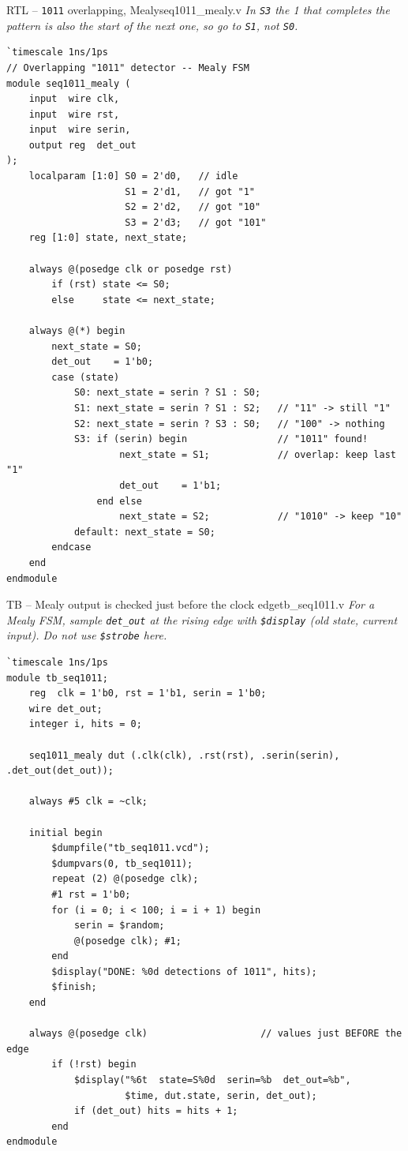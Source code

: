\documentclass[10pt,a4paper]{article}
\newcommand{\slicenote}[1]{{\small\color{black!70}\itshape #1}\par\smallskip}
\begin{document}
\begin{codeslice}{RTL -- \texttt{1011} overlapping, Mealy}{seq1011\_mealy.v}
\slicenote{In \texttt{S3} the 1 that completes the pattern is also the start of the next one, so go to \texttt{S1}, not \texttt{S0}.}
\begin{lstlisting}
`timescale 1ns/1ps
// Overlapping "1011" detector -- Mealy FSM
module seq1011_mealy (
    input  wire clk,
    input  wire rst,
    input  wire serin,
    output reg  det_out
);
    localparam [1:0] S0 = 2'd0,   // idle
                     S1 = 2'd1,   // got "1"
                     S2 = 2'd2,   // got "10"
                     S3 = 2'd3;   // got "101"
    reg [1:0] state, next_state;

    always @(posedge clk or posedge rst)
        if (rst) state <= S0;
        else     state <= next_state;

    always @(*) begin
        next_state = S0;
        det_out    = 1'b0;
        case (state)
            S0: next_state = serin ? S1 : S0;
            S1: next_state = serin ? S1 : S2;   // "11" -> still "1"
            S2: next_state = serin ? S3 : S0;   // "100" -> nothing
            S3: if (serin) begin                // "1011" found!
                    next_state = S1;            // overlap: keep last "1"
                    det_out    = 1'b1;
                end else
                    next_state = S2;            // "1010" -> keep "10"
            default: next_state = S0;
        endcase
    end
endmodule
\end{lstlisting}
\end{codeslice}\begin{codeslice}{TB -- Mealy output is checked just before the clock edge}{tb\_seq1011.v}
\slicenote{For a Mealy FSM, sample \texttt{det\_out} at the rising edge with \texttt{\$display} (old state, current input). Do not use \texttt{\$strobe} here.}
\begin{lstlisting}
`timescale 1ns/1ps
module tb_seq1011;
    reg  clk = 1'b0, rst = 1'b1, serin = 1'b0;
    wire det_out;
    integer i, hits = 0;

    seq1011_mealy dut (.clk(clk), .rst(rst), .serin(serin), .det_out(det_out));

    always #5 clk = ~clk;

    initial begin
        $dumpfile("tb_seq1011.vcd");
        $dumpvars(0, tb_seq1011);
        repeat (2) @(posedge clk);
        #1 rst = 1'b0;
        for (i = 0; i < 100; i = i + 1) begin
            serin = $random;
            @(posedge clk); #1;
        end
        $display("DONE: %0d detections of 1011", hits);
        $finish;
    end

    always @(posedge clk)                    // values just BEFORE the edge
        if (!rst) begin
            $display("%6t  state=S%0d  serin=%b  det_out=%b",
                     $time, dut.state, serin, det_out);
            if (det_out) hits = hits + 1;
        end
endmodule
\end{lstlisting}
\end{codeslice}
\end{document}
